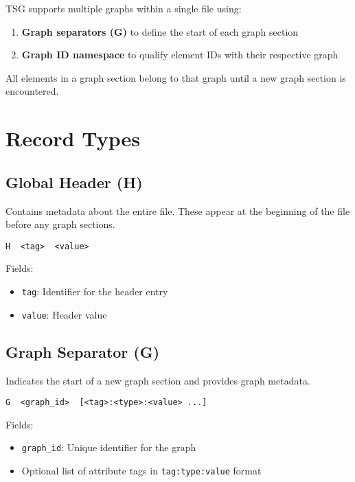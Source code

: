 \documentclass{article}
\begin{document}
TSG supports multiple graphs within a single file using:

\begin{enumerate}
	\item \textbf{Graph separators (G)} to define the start of each graph section
	\item \textbf{Graph ID namespace} to qualify element IDs with their respective graph
\end{enumerate}

All elements in a graph section belong to that graph until a new graph section is encountered.

\section{Record Types}

\subsection{Global Header (H)}

Contains metadata about the entire file.
These appear at the beginning of the file before any graph sections.

\begin{lstlisting}
H  <tag>  <value>
\end{lstlisting}

Fields:
\begin{itemize}
	\item \texttt{tag}: Identifier for the header entry
	\item \texttt{value}: Header value
\end{itemize}

\subsection{Graph Separator (G)}

Indicates the start of a new graph section and provides graph metadata.

\begin{lstlisting}
G  <graph_id>  [<tag>:<type>:<value> ...]
\end{lstlisting}

Fields:
\begin{itemize}
	\item \texttt{graph\_id}: Unique identifier for the graph
	\item Optional list of attribute tags in \texttt{tag:type:value} format
\end{itemize}
\end{document}
